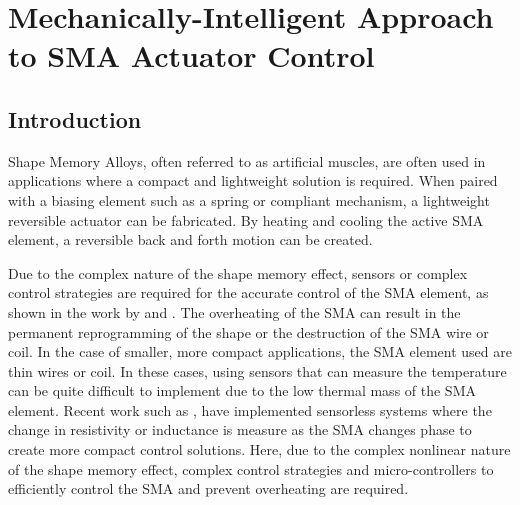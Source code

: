 
\chapter{Mechanically-Intelligent Approach to SMA Actuator Control}\label{chap:integrated-control}


\section{Introduction}
Shape Memory Alloys, often referred to as artificial muscles, are often used in applications where a compact and lightweight solution is required. When paired with a biasing element such as a spring or compliant mechanism, a lightweight reversible actuator can be fabricated. By heating and cooling the active SMA element, a reversible back and forth motion can be created.

Due to the complex nature of the shape memory effect, sensors or complex control strategies are required for the accurate control of the SMA element, as shown in the work by \todocite and \todocite. The overheating of the SMA can result in the permanent reprogramming of the shape or the destruction of the SMA wire or coil. In the case of smaller, more compact applications, the SMA element used are thin wires or coil. In these cases, using sensors that can measure the temperature can be quite difficult to implement due to the low thermal mass of the SMA element. Recent work such as \todocite, have implemented sensorless systems where the change in resistivity or inductance is measure as the SMA changes phase to create more compact control solutions. Here, due to the complex nonlinear nature of the shape memory effect, complex control strategies and micro-controllers to efficiently control the SMA and prevent overheating are required.

